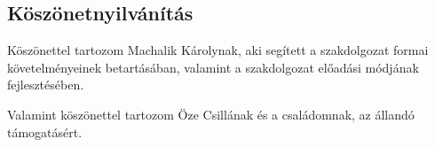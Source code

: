 \begin{center}
\section*{Köszönetnyilvánítás}
\end{center}
\begin{justify}
Köszönettel tartozom Machalik Károlynak, aki segített a szakdolgozat formai követelményeinek betartásában, valamint a szakdolgozat előadási módjának fejlesztésében.

Valamint köszönettel tartozom Öze Csillának és a családomnak, az állandó támogatásért.


\end{justify}